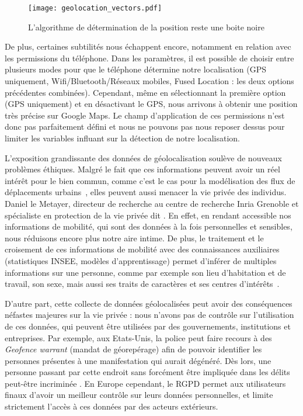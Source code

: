 \documentclass[runningheads]{llncs}
\begin{document}
\begin{figure}
\centering
\texttt{[image: geolocation\_vectors.pdf]}
\caption{L'algorithme de détermination de la position reste une boite noire}
\end{figure}

De plus, certaines subtilités nous échappent encore, notamment en relation avec les permissions du téléphone. Dans les paramètres, il est possible de choisir entre plusieurs modes pour que le téléphone détermine notre localisation (GPS uniquement, Wifi/Bluetooth/Réseaux mobiles, Fused Location : les deux options précédentes combinées). Cependant, même en sélectionnant la première option (GPS uniquement) et en désactivant le GPS, nous arrivons à obtenir une position très précise sur Google Maps. Le champ d'application de ces permissions n'est donc pas parfaitement défini et nous ne pouvons pas nous reposer dessus pour limiter les variables influant sur la détection de notre localisation.

L'exposition grandissante des données de géolocalisation soulève de nouveaux problèmes éthiques. Malgré le fait que ces informations peuvent avoir un réel intérêt pour le bien commun, comme c'est le cas pour la modélisation des flux de déplacements urbains~\cite{calacci_tradeoff_2019}, elles peuvent aussi menacer la vie privée des individus. Daniel le Metayer, directeur de recherche au centre de recherche Inria Grenoble et spécialiste en protection de la vie privée dit . En effet, en rendant accessible nos informations de mobilité, qui sont des données à la fois personnelles et sensibles, nous réduisons encore plus notre aire intime. De plus, le traitement et le croisement de ces informations de mobilité avec des connaissances auxiliaires (statistiques INSEE, modèles d'apprentissage) permet d'inférer de multiples informations sur une personne, comme par exemple son lieu d'habitation et de travail, son sexe, mais aussi ses traits de caractères et ses centres d'intérêts~\cite{boutet_inspect_2019}.

D'autre part, cette collecte de données géolocalisées peut avoir des conséquences néfastes majeures sur la vie privée : nous n'avons pas de contrôle sur l'utilisation de ces données, qui peuvent être utilisées par des gouvernements, institutions et entreprises. Par exemple, aux Etats-Unis, la police peut faire recours à des \textit{Geofence warrant} (mandat de géorepérage) afin de pouvoir identifier les personnes présentes à une manifestation qui aurait dégénéré. Dès lors, une personne passant par cette endroit sans forcément être impliquée dans les délits peut-être incriminée \cite{chatrie_united_2019}. En Europe cependant, le RGPD permet aux utilisateurs finaux d'avoir un meilleur contrôle sur leurs données personnelles, et limite strictement l'accès à ces données par des acteurs extérieurs.
\end{document}

